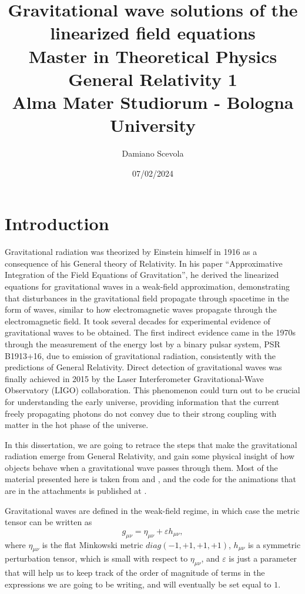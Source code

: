 \documentclass[a4paper]{article}
\title{Gravitational wave solutions of the linearized field equations\\\linespread{1.5}
\small Master in Theoretical Physics\\
General Relativity 1\\
Alma Mater Studiorum - Bologna University}
\author{Damiano Scevola}
\date{07/02/2024}
\begin{document}
\maketitle


\section{Introduction}
Gravitational radiation was theorized by Einstein himself in 1916 as a consequence of his General theory of Relativity. In his paper ``Approximative Integration of the Field Equations of Gravitation'', he derived the linearized equations for gravitational waves in a weak-field approximation, demonstrating that disturbances in the gravitational field propagate through spacetime in the form of waves, similar to how electromagnetic waves propagate through the electromagnetic field. It took several decades for experimental evidence of gravitational waves to be obtained. The first indirect evidence came in the 1970s through the measurement of the energy lost by a binary pulsar system, PSR B1913+16, due to emission of gravitational radiation, consistently with the predictions of General Relativity. Direct detection of gravitational waves was finally achieved in 2015 by the Laser Interferometer Gravitational-Wave Observatory (LIGO) collaboration. This phenomenon could turn out to be crucial for understanding the early universe, providing information that the current freely propagating photons do not convey due to their strong coupling with matter in the hot phase of the universe.

In this dissertation, we are going to retrace the steps that make the gravitational radiation emerge from General Relativity, and gain some physical insight of how objects behave when a gravitational wave passes through them. Most of the material presented here is taken from \cite{carrol} and \cite{cas}, and the code for the animations that are in the attachments is published at \cite{lusvelt}.

Gravitational waves are defined in the weak-field regime, in which case the metric tensor can be written as
\begin{equation}
  g_{\mu\nu} = \eta_{\mu\nu} + \varepsilon h_{\mu\nu},
  \label{eq:metric-weak}
\end{equation}
where $\eta_{\mu\nu}$ is the flat Minkowski metric $diag(-1,+1,+1,+1)$, $h_{\mu\nu}$ is a symmetric perturbation tensor, which is small with respect to $\eta_{\mu\nu}$, and $\varepsilon$ is just a parameter that will help us to keep track of the order of magnitude of terms in the expressions we are going to be writing, and will eventually be set equal to $1$.
\end{document}
